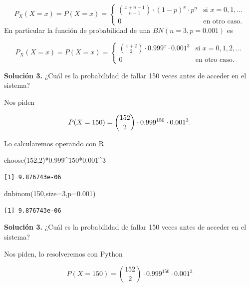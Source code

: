 \documentclass[
  letterpaper,
  DIV=11,
  numbers=noendperiod]{scrreprt}
\newenvironment{Shaded}{\begin{snugshade}}{\end{snugshade}}
\newcommand{\AttributeTok}[1]{\textcolor[rgb]{0.40,0.45,0.13}{#1}}
\newcommand{\DecValTok}[1]{\textcolor[rgb]{0.68,0.00,0.00}{#1}}
\newcommand{\FloatTok}[1]{\textcolor[rgb]{0.68,0.00,0.00}{#1}}
\newcommand{\FunctionTok}[1]{\textcolor[rgb]{0.28,0.35,0.67}{#1}}
\newcommand{\NormalTok}[1]{\textcolor[rgb]{0.00,0.23,0.31}{#1}}
\newcommand{\SpecialCharTok}[1]{\textcolor[rgb]{0.37,0.37,0.37}{#1}}
\begin{document}
\[
P_X(X=x)=P(X=x)=
\left\{
\begin{array}{cc} 
{x+n-1\choose n-1} \cdot (1-p)^{x}\cdot p^n & \mbox{si } x=0,1,\ldots \\ 0 & \mbox{en otro caso.}\end{array}\right.
\] En particular la función de probabilidad de una \(BN(n=3,p=0.001)\)
es

\[
P_X(X=x)=P(X=x)=
\left\{
\begin{array}{cc} 
{x+2\choose 2} \cdot 0.999^{x}\cdot 0.001^3 & \mbox{si } x=0,1,2,\ldots \\ 0 & \mbox{en otro caso.}\end{array}\right.
\]

\textbf{Solución 3.} ¿Cuál es la probabilidad de fallar 150 veces antes
de acceder en el sistema?

Nos piden

\[
\scriptsize{P(X=150)= {152\choose 2} \cdot 0.999^{150}\cdot 0.001^3.}
\]

Lo calcularemos operando con R

\begin{Shaded}
\begin{Highlighting}[]
\FunctionTok{choose}\NormalTok{(}\DecValTok{152}\NormalTok{,}\DecValTok{2}\NormalTok{)}\SpecialCharTok{*}\FloatTok{0.999}\SpecialCharTok{\^{}}\DecValTok{150}\SpecialCharTok{*}\FloatTok{0.001}\SpecialCharTok{\^{}}\DecValTok{3}
\end{Highlighting}
\end{Shaded}

\begin{verbatim}
[1] 9.876743e-06
\end{verbatim}

\begin{Shaded}
\begin{Highlighting}[]
\FunctionTok{dnbinom}\NormalTok{(}\DecValTok{150}\NormalTok{,}\AttributeTok{size=}\DecValTok{3}\NormalTok{,}\AttributeTok{p=}\FloatTok{0.001}\NormalTok{)}
\end{Highlighting}
\end{Shaded}

\begin{verbatim}
[1] 9.876743e-06
\end{verbatim}

\textbf{Solución 3.} ¿Cuál es la probabilidad de fallar 150 veces antes
de acceder en el sistema?

Nos piden, lo resolveremos con Python

\[
P(X=150)= {152\choose 2} \cdot 0.999^{150}\cdot 0.001^3
\]
\end{document}
